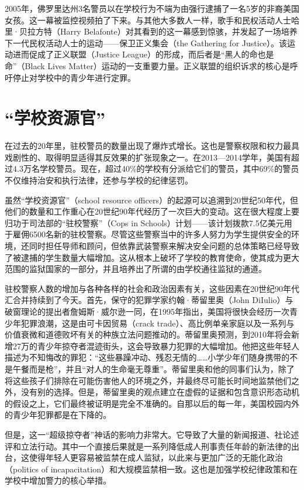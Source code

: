 \documentclass[fontset=fandol, a4paper, 12pt, openright]{ctexbook}
\begin{document}
2005年，佛罗里达州3名警员以在学校行为不端为由强行逮捕了一名5岁的非裔美国女孩。这一幕被监控视频拍了下来。与其他大多数人一样，歌手和民权活动人士哈里·贝拉方特（Harry Belafonte）对其看到的这一幕感到惊骇，并发起了一场培养下一代民权活动人士的运动——保卫正义集会（the Gathering for Justice）。该运动进而促成了正义联盟（Justice League）的形成，而后者是“黑人的命也是命”（Black Lives Matter）运动的一支重要力量。正义联盟的组织诉求的核心是呼吁停止对学校中的青少年进行定罪。

\section{“学校资源官”}

在过去的20年里，驻校警员的数量出现了爆炸式增长。这也是警察权限和权力最具戏剧性的、取得明显适得其反效果的扩张现象之一。在2013—2014学年，美国有超过4.3万名学校警员。现在，超过40\%的学校有分派给它们的警员，其中69\%的警员不仅维持治安和执行法律，还参与学校的纪律惩罚。

虽然“学校资源官”（school resource officers）的起源可以追溯到20世纪50年代，但他们的数量和工作重心在20世纪90年代经历了一次巨大的变动。这在很大程度上要归功于司法部的“驻校警察”（Cops in Schools）计划——该计划拨款7.5亿美元用于雇佣6500名新的驻校警察。尽管这些警察当中的许多人努力为学生提供安全的环境，还同时担任导师和顾问，但依靠武装警察来解决安全问题的总体策略已经导致了被逮捕的学生数量大幅增加。这从根本上破坏了学校的教育使命，使其成为更大范围的监狱国家的一部分，并且培养出了所谓的由学校通往监狱的通道。

驻校警察人数的增加与各种各样的社会和政治因素有关，这些因素在20世纪90年代汇合并持续到了今天。首先，保守的犯罪学家约翰·蒂留里奥（John DiIulio）与破窗理论的提出者詹姆斯·威尔逊一同，在1995年指出，美国将很快会经历一次青少年犯罪浪潮，这是由可卡因贸易（crack trade）、高比例单亲家庭以及一系列与价值衰微和道德败坏有关的种族立法问题推动的。蒂留里奥预测，到2010年将会新增27万的青少年掠夺者混迹街头，这会导致暴力犯罪的大幅增加。他把这些年轻人描述为不知悔改的罪犯：“这些暴躁冲动、残忍无情的……小学少年们随身携带的不是午餐而是枪”，并且“对人的生命毫无尊重”。蒂留里奥和他的同事们认为，除了将这些孩子们排除在可能伤害他人的环境之外，并最终尽可能长时间地监禁他们之外，没有别的选择。但是，蒂留里奥的观点建立在虚假的证据和包含意识形态动机的假设之上，它们最终被证明是完全不准确的。自那以后的每一年，美国校园内外的青少年犯罪都是在下降的。

但是，这一“超级掠夺者”神话的影响力非常大。它导致了大量的新闻报道、社论述评和立法行动。其中一个直接后果就是一系列降低成人刑事责任年龄的新法律的出台，这使得年轻人更容易被监禁在成人监狱，以此来与更加广泛的无能化政治（politics of incapacitation）和大规模监禁相一致。这也是加强学校纪律政策和在学校中增加警力的核心举措。
\end{document}
